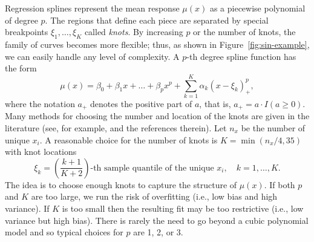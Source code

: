 \documentclass[cmfont,usenames,dvipsnames,leqno]{afit-etd}\usepackage[]{graphicx}\usepackage[]{color}
\begin{document}
Regression splines represent the mean response $\mu(x)$ as a piecewise polynomial of degree $p$. The regions that define each piece are separated by special breakpoints  $\xi_1, \dotsc, \xi_K$ called \textit{knots}. By increasing $p$ or the number of knots, the family of curves becomes more flexible; thus, as shown in Figure~\ref{fig:sin-example}, we can easily handle any level of complexity. A $p$-th degree spline function has the form
\begin{equation}
\label{eqn:spline-model}
  \mu(x) = \beta_0 + \beta_1x + \dotsc + \beta_px^p + \sum_{k = 1}^K \alpha_k(x - \xi_k)_+^p,
\end{equation}
where the notation $a_+$ denotes the positive part of $a$, that is, $a_+ = a \cdot I(a \ge 0)$. Many methods for choosing the number and location of the knots are given in the literature (see, for example, \citet{ruppert_selecting_2002} and the references therein). Let $n_x$ be the number of unique $x_i$. A reasonable choice for the number of knots \citep[pg. 126]{ruppert_semiparametric_2003} is $K = \min(n_x/4, 35)$ with knot locations
\begin{equation*}
  \xi_k = \left(\frac{k+1}{K+2}\right)\text{-th sample quantile of the unique } x_i, \quad k = 1, \dotsc, K.
\end{equation*}
The idea is to choose enough knots to capture the structure of $\mu(x)$. If both $p$ and $K$ are too large, we run the risk of overfitting (i.e., low bias and high variance). If $K$ is too small then the resulting fit may be too restrictive (i.e., low variance but high bias). There is rarely the need to go beyond a cubic polynomial model and so typical choices for $p$ are 1, 2, or 3.
\end{document}
